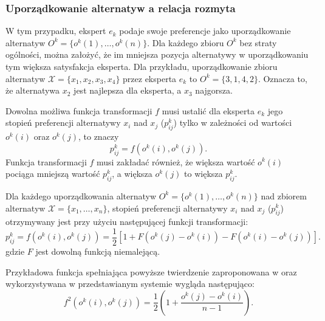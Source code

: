 \subsubsection{Uporządkowanie alternatyw a relacja rozmyta}
W tym przypadku, ekspert $e_k$ podaje swoje preferencje jako uporządkowanie
alternatyw $O^k = \{o^k(1), \dotsc, o^k(n)\}$. Dla każdego zbioru $O^k$ bez
straty ogólności, można założyć, że im mniejsza pozycja alternatywy w
uporządkowaniu tym większa satysfakcja eksperta. Dla przykładu, uporządkowanie
zbioru alternatyw $\mathcal{X} = \{x_1,x_2,x_3,x_4\}$ przez eksperta $e_k$ to
$O^k = \{3,1,4,2\}.$ Oznacza to, że alternatywa $x_2$ jest najlepsza dla
eksperta, a $x_3$ najgorsza.

Dowolna możliwa funkcja transformacji $f$ musi ustalić dla eksperta $e_k$ jego
stopień preferencji alternatywy $x_i$ nad $x_j$ ($p^k_{ij}$) tylko w zależności
od wartości $o^k(i)$ oraz $o^k(j)$, to znaczy
\begin{equation}
p^k_{ij} = f(o^k(i), o^k(j)).
\end{equation}
Funkcja transformacji $f$ musi zakładać również, że większa wartość $o^k(i)$
pociąga mniejszą wartość $p^k_{ij}$, a większa $o^k(j)$ to większa $p^k_{ij}$.

\begin{theorem}
Dla każdego uporządkowania alternatyw $O^k = \{o^k(1), \dotsc, o^k(n)\}$ nad
zbiorem alternatyw $\mathcal{X} = \{x_1,\dotsc,x_n\}$, stopień preferencji
alternatywy $x_i$ nad $x_j$ ($p^k_{ij}$) otrzymywany jest przy użyciu
następującej funkcji transformacji:
\begin{equation}
p^k_{ij} = f(o^k(i),o^k(j)) = \frac{1}{2} [1 + F(o^k(j) - o^k(i)) - F(o^k(i) -
o^k(j))].
\end{equation}
gdzie $F$ jest dowolną funkcją niemalejącą.
\end{theorem}

Przykładowa funkcja spełniająca powyższe twierdzenie zaproponowana w
\cite{Chiclana1996} oraz wykorzystywana w przedstawianym systemie wygląda
następująco:
\begin{equation}
f^2(o^k(i),o^k(j)) = \frac{1}{2}(1 + \frac{o^k(j) - o^k(i) }{n-1}).
\end{equation}

